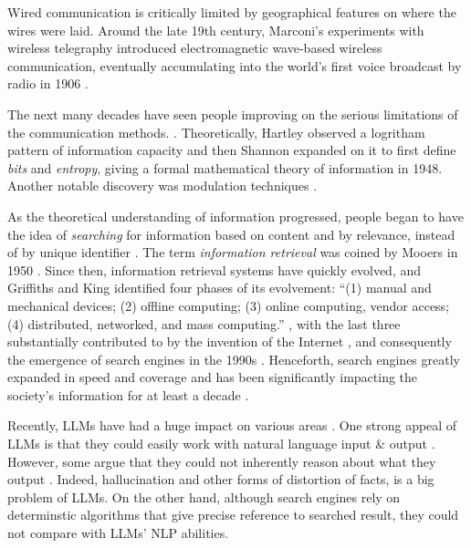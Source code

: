 \documentclass[project-plan]{report-template}
\begin{document}
Wired communication is critically limited by geographical
features on where the wires were laid. Around the late 19th century, 
Marconi's experiments with wireless telegraphy \cite{history.wireless.1}
introduced electromagnetic wave-based wireless communication, eventually
accumulating into the world's first voice broadcast by radio in 1906
\cite{first.voice.broadcast}. 

The next many decades have seen people improving on the serious limitations of
the communication methods. \cite{wireless.weakness.1, wireless.weakness.2,
wireless.weakness.3}.  Theoretically, Hartley observed a logritham pattern of
information capacity \cite{hartley.log.information} and then Shannon expanded
on it to first define \emph{bits} and \emph{entropy}, giving a formal
mathematical theory of information \cite{shannon.theory.communication} in 1948.
Another notable discovery was modulation techniques \cite{history.modulation}. 

As the theoretical understanding of information progressed, people began to
have the idea of \emph{searching} for information based on content
and by relevance, instead of by unique identifier
\cite{history.information.retrieval}. The term \emph{information
retrieval} was coined by Mooers in 1950
\cite{mooers.info.ret.term}. Since then, information retrieval systems have
quickly evolved, and Griffiths and King identified four phases of its
evolvement: ``(1) manual and mechanical
devices; (2) offline computing; (3) online computing, vendor access; (4)
distributed, networked, and mass computing.'' \cite{info.ret.4.phases}, with
the last three substantially contributed to by the invention of the Internet
\cite{history.internet}, and consequently the emergence of search engines in
the 1990s \cite{history.search.engines, history.internet.search.engines}.
Henceforth, search engines greatly expanded in speed and
coverage and has been significantly impacting the society's information for at
least a decade \cite{search.engine.impact.1, search.engine.impact.2}.

Recently, LLMs have had a huge impact on various areas \cite{llm.impact.1}. One
strong appeal of LLMs is that they could easily work with natural language
input \& output \cite{llm.power.1, llm.power.2}. However, some argue that they
could not inherently
reason about what they output \cite{llm.limit.1, llm.limit.2, llm.limit.3}.
Indeed, hallucination \cite{llm.hallucination.1, llm.hallucination.2} and other
forms of distortion of facts, is a big problem of LLMs. On the other hand,
although search engines rely on determinstic algorithms that give precise
reference to searched result, they could not compare with LLMs' NLP abilities.
\end{document}

